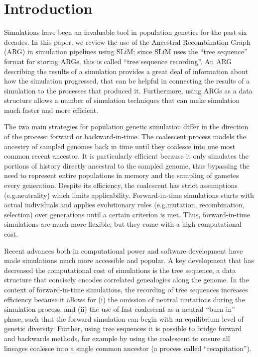 \documentclass[12pt]{article}
\newcommand*{\eg}{e.g.\xcomma}
\begin{document}
\section*{Introduction}
Simulations have been an invaluable tool in population genetics for the past six decades.
In this paper, we review the use of the Ancestral Recombination Graph (ARG)
in simulation pipelines using SLiM;
since SLiM uses the ``tree sequence'' format for storing ARGs,
this is called ``tree sequence recording''.
An ARG describing the results of a simulation
provides a great deal of information about how the simulation progressed,
that can be helpful in connecting the results of a simulation
to the processes that produced it.
Furthermore, using ARGs as a data structure allows a number of simulation techniques
that can make simulation much faster and more efficient.

The two main strategies for population genetic simulation differ in the direction of the process: forward or backward-in-time.
The coalescent process models the ancestry of sampled genomes back in time until they coalesce into one most common recent ancestor. %
It is particularly efficient because
it only simulates the portions of history directly ancestral to the sampled genome,
thus bypassing the need to represent entire populations in memory and the sampling of gametes every generation.
Despite its efficiency, the coalescent has strict assumptions (\eg neutrality) which limits applicability.
Forward-in-time simulations starts with actual individuals and applies evolutionary rules (\eg mutation, recombination, selection) over generations until a certain criterion is met.
Thus, forward-in-time simulations are much more flexible, but they come with a high computational cost.

Recent advances both in computational power and software development have made simulations much more accessible and popular.
A key development that has decreased the computational cost of simulations is the tree sequence,
a data structure that concisely encodes correlated genealogies along the genome.
In the context of forward-in-time simulations,
the recording of tree sequences increases efficiency because it allows for
(i) the omission of neutral mutations during the simulation process, and
(ii) the use of fast coalescent as a neutral ``burn-in'' phase,
such that the forward simulation can begin with an equilibrium level of genetic diversity.
Further, using tree sequences it is possible to bridge forward and backwards methods, 
for example by using the coalescent to ensure all lineages coalesce into a single common ancestor (a process called ``recapitation'').
\end{document}
